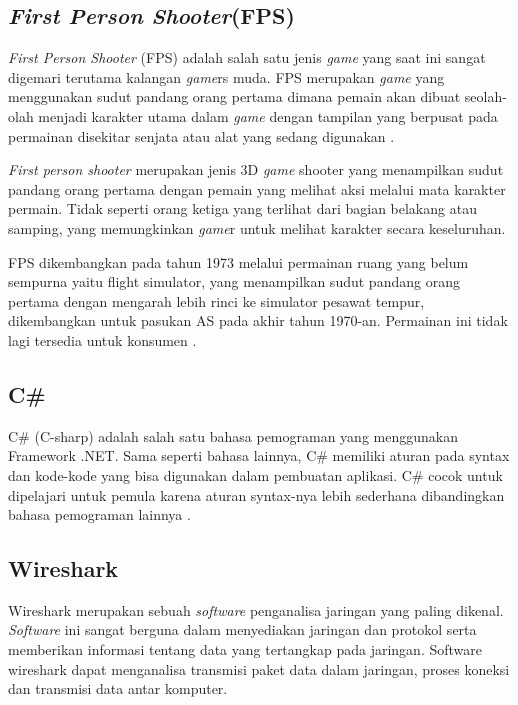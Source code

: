 \subsection{\textit{First Person Shooter}(FPS)}
\noindent

\textit{First Person Shooter} (FPS) adalah salah satu jenis \textit{game} yang saat ini sangat digemari terutama kalangan \textit{game}rs muda. FPS merupakan \textit{game} yang menggunakan sudut pandang orang pertama dimana pemain akan dibuat seolah-olah menjadi karakter utama dalam \textit{game} dengan tampilan yang berpusat pada permainan disekitar senjata atau alat yang sedang digunakan \cite{fps}.

\textit{First person shooter} merupakan jenis 3D \textit{game} shooter yang menampilkan sudut pandang orang pertama dengan 
pemain yang melihat aksi melalui mata karakter permain. Tidak seperti orang ketiga yang terlihat dari bagian 
belakang atau samping, yang memungkinkan \textit{game}r untuk melihat karakter secara keseluruhan\cite{fps}.

FPS dikembangkan pada tahun 1973 melalui permainan ruang yang belum sempurna yaitu flight simulator, yang 
menampilkan sudut pandang orang pertama dengan mengarah lebih rinci ke simulator pesawat tempur, dikembangkan untuk pasukan AS pada akhir tahun 1970-an. Permainan ini tidak lagi tersedia untuk konsumen \cite{fps}.

\subsection{C\#}
\noindent

C\# (C-sharp) adalah salah satu bahasa pemograman yang menggunakan Framework .NET. Sama seperti 
bahasa lainnya, C\# memiliki aturan pada syntax dan kode-kode yang bisa digunakan dalam pembuatan aplikasi. 
C\# cocok untuk dipelajari untuk pemula karena aturan syntax-nya lebih sederhana dibandingkan bahasa 
pemograman lainnya \cite{Ansori}.

\subsection{Wireshark}
\noindent

Wireshark merupakan sebuah \textit{software} penganalisa jaringan yang paling dikenal. \textit{Software} ini 
sangat berguna dalam menyediakan jaringan dan protokol serta memberikan informasi tentang 
data yang tertangkap pada jaringan. Software wireshark dapat menganalisa transmisi paket data 
dalam jaringan, proses koneksi dan transmisi data antar komputer\cite{wireshark}.

